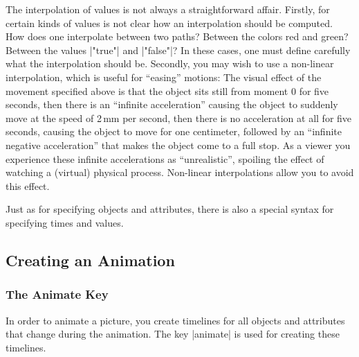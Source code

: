 The interpolation of values is not always a straightforward affair. Firstly,
for certain kinds of values is not clear how an interpolation should be
computed. How does one interpolate between two paths? Between the colors red
and green? Between the values |"true"| and |"false"|? In these cases, one must
define carefully what the interpolation should be. Secondly, you may wish to
use a non-linear interpolation, which is useful for ``easing'' motions: The
visual effect of the movement specified above is that the object sits still
from moment $0$ for five seconds, then there is an ``infinite acceleration''
causing the object to suddenly move at the speed of 2\,mm per second, then
there is no acceleration at all for five seconds, causing the object to move
for one centimeter, followed by an ``infinite negative acceleration'' that
makes the object come to a full stop. As a viewer you experience these infinite
accelerations as ``unrealistic'', spoiling the effect of watching a (virtual)
physical process. Non-linear interpolations allow you to avoid this effect.

Just as for specifying objects and attributes, there is also a special syntax
for specifying times and values.


\subsection{Creating an Animation}

\subsubsection{The Animate Key}

In order to animate a picture, you create timelines for all objects and
attributes that change during the animation. The key |animate| is used for
creating these timelines.

